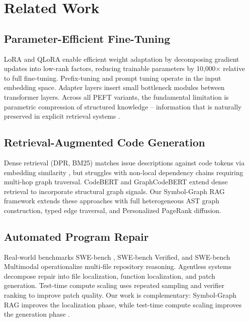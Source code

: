 \documentclass[10pt,twocolumn,letterpaper]{article}
\begin{document}
\section{Related Work}



\subsection{Parameter-Efficient Fine-Tuning}


LoRA \cite{crossref_10_48550_arxiv_2106_09685} and QLoRA \cite{crossref_10_48550_arxiv_2305_14314} enable efficient weight adaptation by decomposing gradient updates into low-rank factors, reducing trainable parameters by 10,000$\times$ relative to full fine-tuning. Prefix-tuning \cite{arxiv_2101_00190} and prompt tuning operate in the input embedding space. Adapter layers insert small bottleneck modules between transformer layers. Across all PEFT variants, the fundamental limitation is parametric compression of structured knowledge -- information that is naturally preserved in explicit retrieval systems \cite{arxiv_2101_00190}.


\subsection{Retrieval-Augmented Code Generation}


Dense retrieval (DPR, BM25) matches issue descriptions against code tokens via embedding similarity \cite{arxiv_2501_02842}, but struggles with non-local dependency chains requiring multi-hop graph traversal. CodeBERT \cite{arxiv_2002_08155} and GraphCodeBERT extend dense retrieval to incorporate structural graph signals. Our Symbol-Graph RAG framework extends these approaches with full heterogeneous AST graph construction, typed edge traversal, and Personalized PageRank diffusion.


\subsection{Automated Program Repair}


Real-world benchmarks SWE-bench \cite{arxiv_2505_23419}, SWE-bench Verified, and SWE-bench Multimodal operationalize multi-file repository reasoning. Agentless systems decompose repair into file localization, function localization, and patch generation. Test-time compute scaling uses repeated sampling and verifier ranking to improve patch quality. Our work is complementary: Symbol-Graph RAG improves the localization phase, while test-time compute scaling improves the generation phase \cite{arxiv_2412_06333}.
\end{document}
